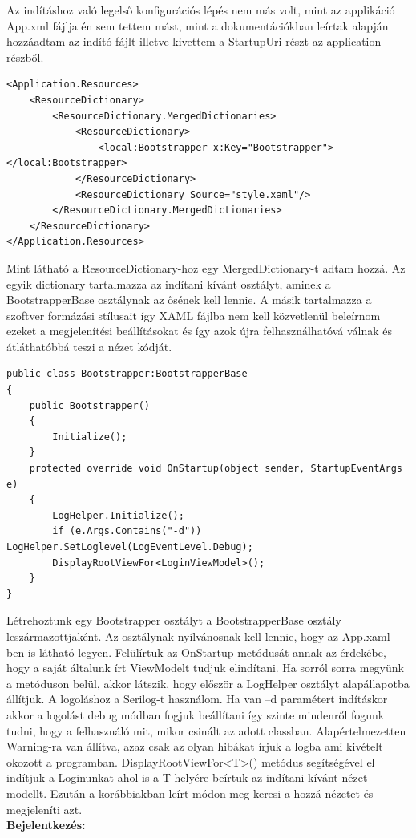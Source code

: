 \documentclass[
]{thesis-ekf}
\theoremstyle{definition}
\theoremstyle{remark}
\begin{document}
Az indításhoz való legelső konfigurációs lépés nem más volt, mint az applikáció App.xml fájlja én sem tettem mást, mint a dokumentációkban leírtak alapján hozzáadtam az indító fájlt illetve kivettem a StartupUri részt az application részből.
\begin{lstlisting}
<Application.Resources>
	<ResourceDictionary>
		<ResourceDictionary.MergedDictionaries>
			<ResourceDictionary>
				<local:Bootstrapper x:Key="Bootstrapper"></local:Bootstrapper>
			</ResourceDictionary>
			<ResourceDictionary Source="style.xaml"/>
		</ResourceDictionary.MergedDictionaries>
	</ResourceDictionary>        
</Application.Resources>
\end{lstlisting}
Mint látható a ResourceDictionary-hoz egy MergedDictionary-t adtam hozzá. Az egyik dictionary tartalmazza az indítani kívánt osztályt, aminek a BootstrapperBase osztálynak az ősének kell lennie. A másik tartalmazza a szoftver formázási stílusait így XAML fájlba nem kell közvetlenül beleírnom ezeket a megjelenítési beállításokat és így azok újra felhasználhatóvá válnak és átláthatóbbá teszi a nézet kódját.
\begin{lstlisting}
public class Bootstrapper:BootstrapperBase
{
	public Bootstrapper()
	{
		Initialize();
	}
	protected override void OnStartup(object sender, StartupEventArgs e)
	{
		LogHelper.Initialize();
		if (e.Args.Contains("-d")) LogHelper.SetLoglevel(LogEventLevel.Debug);
		DisplayRootViewFor<LoginViewModel>();
	}
}

\end{lstlisting}
Létrehoztunk egy Bootstrapper osztályt a BootstrapperBase osztály leszármazottjaként. Az osztálynak nyílvánosnak kell lennie, hogy az App.xaml-ben is látható legyen. Felülírtuk az OnStartup metódusát annak az érdekébe, hogy a saját általunk írt ViewModelt tudjuk elindítani. Ha sorról sorra megyünk a metóduson belül, akkor látszik, hogy először a LogHelper osztályt alapállapotba állítjuk. A logoláshoz a Serilog-t használom. Ha van –d paramétert indításkor akkor a logolást debug módban fogjuk beállítani így szinte mindenről fogunk tudni, hogy a felhasználó mit, mikor csinált az adott classban. Alapértelmezetten Warning-ra van állítva, azaz csak az olyan hibákat írjuk a logba ami kivételt okozott a programban. DisplayRootViewFor<T>() metódus segítségével el indítjuk a Loginunkat ahol is a T helyére beírtuk az indítani kívánt nézet-modellt. Ezután a korábbiakban leírt módon meg keresi a hozzá nézetet és megjeleníti azt.\\
\textbf{Bejelentkezés:}
\end{document}
